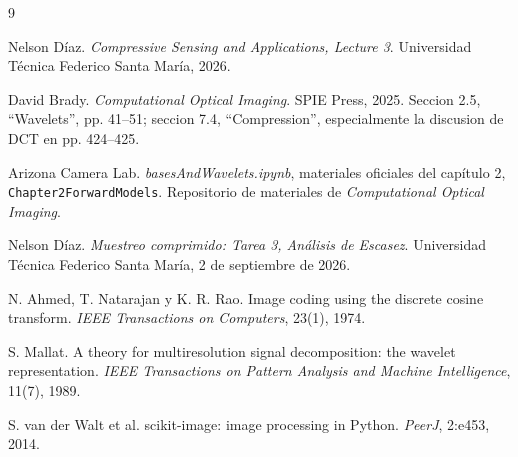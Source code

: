 \documentclass[11pt,a4paper]{article}
\begin{document}
\begin{thebibliography}{9}

Nelson Díaz. \textit{Compressive Sensing and Applications, Lecture 3}. Universidad Técnica Federico Santa María, 2026.

David Brady. \textit{Computational Optical Imaging}. SPIE Press, 2025. Seccion 2.5, ``Wavelets'', pp. 41--51; seccion 7.4, ``Compression'', especialmente la discusion de DCT en pp. 424--425.

Arizona Camera Lab. \textit{basesAndWavelets.ipynb}, materiales oficiales del cap\'itulo 2, \texttt{Chapter2ForwardModels}. Repositorio de materiales de \textit{Computational Optical Imaging}.

Nelson Díaz. \textit{Muestreo comprimido: Tarea 3, Análisis de Escasez}. Universidad Técnica Federico Santa María, 2 de septiembre de 2026.

N. Ahmed, T. Natarajan y K. R. Rao. Image coding using the discrete cosine transform. \textit{IEEE Transactions on Computers}, 23(1), 1974.

S. Mallat. A theory for multiresolution signal decomposition: the wavelet representation. \textit{IEEE Transactions on Pattern Analysis and Machine Intelligence}, 11(7), 1989.

S. van der Walt et al. scikit-image: image processing in Python. \textit{PeerJ}, 2:e453, 2014.

\end{thebibliography}
\end{document}
